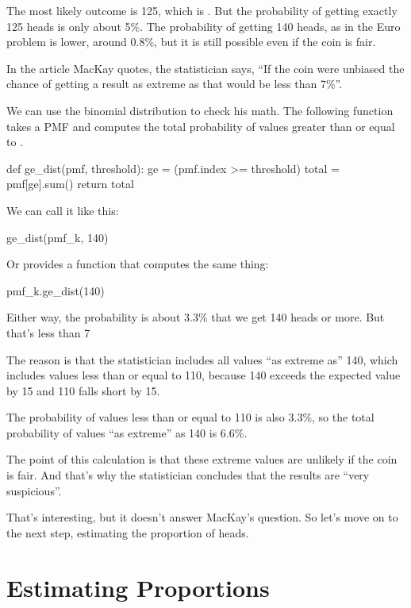 \documentclass[12pt]{book}
\theoremstyle{exercise}
\begin{document}
The most likely outcome is 125, which is .
But the probability of getting exactly 125 heads is only about 5\%.
The probability of getting 140 heads, as in the Euro problem is lower, around 0.8\%, but it is still possible even if the coin is fair.

In the article MacKay quotes, the statistician says, ``If the coin were unbiased the chance of getting a result as extreme as that would be less than 7\%''.

We can use the binomial distribution to check his math.  The following function takes a PMF and computes the total probability of values greater than or equal to . 

\begin{code}
def ge_dist(pmf, threshold):
    ge = (pmf.index >= threshold)
    total = pmf[ge].sum()
    return total
\end{code}

We can call it like this:

\begin{code}
ge_dist(pmf_k, 140)
\end{code}

Or  provides a function that computes the same thing:

\begin{code}
pmf_k.ge_dist(140)
\end{code}

Either way, the probability is about 3.3\% that we get 140 heads or more.
But that's less than 7%

The reason is that the statistician includes all values ``as extreme as'' 140, which includes values less than or equal to 110, because 140 exceeds the expected value by 15 and 110 falls short by 15.

The probability of values less than or equal to 110 is also 3.3\%,
so the total probability of values ``as extreme'' as 140 is 6.6\%.

The point of this calculation is that these extreme values are unlikely if the coin is fair.
And that's why the statistician concludes that the results are ``very suspicious''.

That's interesting, but it doesn't answer MacKay's question.  So let's move on to the next step, estimating the proportion of heads.


\section{Estimating Proportions}
\label{estprop}
\end{document}
